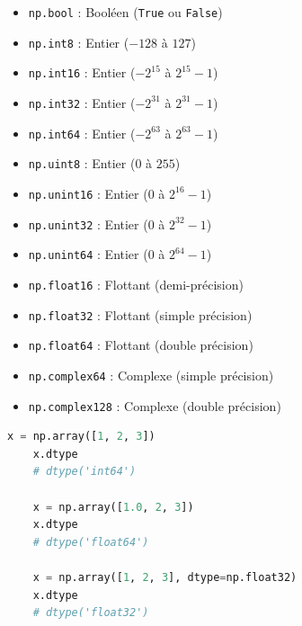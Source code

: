 \documentclass[aspectratio=169]{beamer}
\begin{document}
\begin{frame}
  \begin{multicols}{2}
    \begin{itemize}
    \item \texttt{np.bool} : Booléen (\texttt{True} ou \texttt{False})

    \item \texttt{np.int8} : Entier ($-128$ à $127$)
    \item \texttt{np.int16} : Entier ($-2^{15}$ à $2^{15}-1$)
    \item \texttt{np.int32} : Entier ($-2^{31}$ à $2^{31}-1$)
    \item \texttt{np.int64} : Entier ($-2^{63}$ à $2^{63}-1$)

    \item \texttt{np.uint8} : Entier ($0$ à $255$)
    \item \texttt{np.unint16} : Entier ($0$ à $2^{16}-1$)
    \item \texttt{np.unint32} : Entier ($0$ à $2^{32}-1$)
    \item \texttt{np.unint64} : Entier ($0$ à $2^{64}-1$)

    \item \texttt{np.float16} : Flottant (demi-précision)
    \item \texttt{np.float32} : Flottant (simple précision)
    \item \texttt{np.float64} : Flottant (double précision)

    \item \texttt{np.complex64} : Complexe (simple précision)
    \item \texttt{np.complex128} : Complexe (double précision)
    \end{itemize}
  \end{multicols}
\end{frame}




\begin{frame}[fragile]{}{}
  \vfill
  \begin{lstlisting}[language=Python]
    x = np.array([1, 2, 3])
    x.dtype
    # dtype('int64')

    x = np.array([1.0, 2, 3])
    x.dtype
    # dtype('float64')

    x = np.array([1, 2, 3], dtype=np.float32)
    x.dtype
    # dtype('float32')
  \end{lstlisting}
  \vfill
\end{frame}
\end{document}
